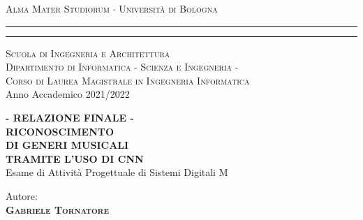 \begin{titlepage}
\begin{center}
    {{\Large{\textsc{Alma Mater Studiorum $\cdot$ Universit\`a di
    Bologna}}}}
	\rule[0.1cm]{15.8cm}{0.1mm}
    \rule[0.5cm]{15.8cm}{0.6mm}
    {\normalsize{\textsc { Scuola di Ingegneria e Architettura\\
    \vspace{5mm}
    Dipartimento di Informatica - Scienza e Ingegneria -\\
    \vspace{5mm}
    Corso di Laurea Magistrale in Ingegneria Informatica}}}\\
	\vspace{10mm}
	{\small{\sc Anno Accademico 2021/2022}}%
\end{center}
\vspace{10mm}
\begin{center}
    {\LARGE\textbf{- RELAZIONE FINALE -}}\\
    \vspace{3mm}
    {\LARGE\textbf{RICONOSCIMENTO}}\\
    \vspace{3mm}
    {\LARGE\textbf{DI GENERI MUSICALI}}\\
    \vspace{3mm}
    {\LARGE{\bf TRAMITE L'USO DI CNN}}\\
    \vspace{10mm} {\large{\sc Esame di Attività Progettuale di Sistemi Digitali M}}
\end{center}
\vfill
\par
\noindent
\begin{minipage}[t]{0.47\textwidth}
    {\large{\sc Autore:}\\
    {\bf \textsc{Gabriele Tornatore}}}\\
\end{minipage}
\vspace{20mm}
\end{titlepage}
\restoregeometry
